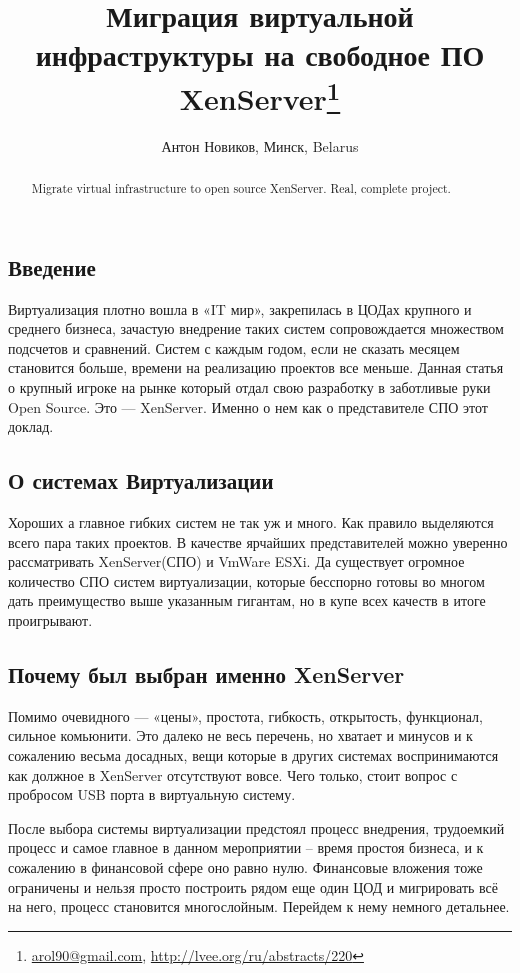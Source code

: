 \documentclass[10pt, a5paper]{article}
\begin{document}
\title{Миграция виртуальной инфраструктуры на свободное ПО XenServer\footnote{\url{arol90@gmail.com}, \url{http://lvee.org/ru/abstracts/220}}}
\author{Антон Новиков, Минск, Belarus}
\maketitle
\begin{abstract}
Migrate virtual infrastructure to open source XenServer. Real, complete project.
\end{abstract}
\subsection*{Введение}
Виртуализация плотно вошла в «IT  мир», закрепилась в ЦОДах крупного и среднего бизнеса, зачастую внедрение таких систем сопровождается множеством подсчетов и сравнений. Систем с каждым годом, если не сказать месяцем становится больше, времени на реализацию проектов все меньше.
Данная статья о крупный игроке на рынке который отдал свою разработку в заботливые руки Open Source. Это — XenServer. Именно о нем как о представителе СПО этот доклад.

\subsection*{О системах Виртуализации}
Хороших а главное гибких систем не так уж и много. Как правило выделяются всего пара таких проектов. В качестве ярчайших представителей можно уверенно рассматривать XenServer(СПО) и VmWare ESXi. Да существует огромное количество СПО систем виртуализации, которые бесспорно готовы во многом дать преимущество выше указанным гигантам, но в купе всех качеств в итоге проигрывают.

\subsection*{Почему был выбран именно XenServer}
Помимо очевидного — «цены», простота, гибкость, открытость, функционал, сильное комьюнити.
Это далеко не весь перечень, но хватает и минусов и к сожалению весьма досадных, вещи которые в других системах воспринимаются как должное в XenServer отсутствуют вовсе.
Чего только, стоит вопрос с пробросом USB порта в виртуальную систему.

После выбора системы виртуализации предстоял процесс внедрения,  трудоемкий процесс и самое главное в данном мероприятии -- время простоя бизнеса, и к сожалению в финансовой сфере оно равно нулю. Финансовые вложения тоже ограничены и нельзя просто построить рядом еще один ЦОД и мигрировать всё на него, процесс становится многослойным. Перейдем к нему немного детальнее.
\end{document}
